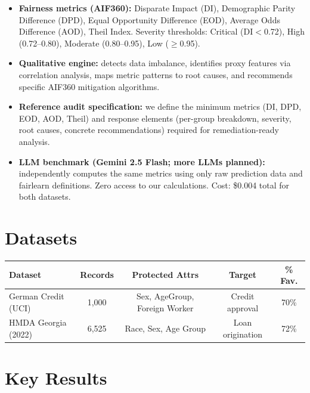 \documentclass[11pt,a4paper]{article}
\begin{document}
\begin{itemize}[nosep, leftmargin=*]
  \item \textbf{Fairness metrics (AIF360):} Disparate Impact (DI), Demographic
        Parity Difference (DPD), Equal Opportunity Difference (EOD), Average
        Odds Difference (AOD), Theil Index. Severity thresholds: Critical
        (DI$<$0.72), High (0.72--0.80), Moderate (0.80--0.95), Low ($\geq$0.95).
  \item \textbf{Qualitative engine:} detects data imbalance, identifies proxy
        features via correlation analysis, maps metric patterns to root causes,
        and recommends specific AIF360 mitigation algorithms.
  \item \textbf{Reference audit specification:} we define the minimum metrics
        (DI, DPD, EOD, AOD, Theil) and response elements (per-group breakdown,
        severity, root causes, concrete recommendations) required for
        remediation-ready analysis.
  \item \textbf{LLM benchmark (Gemini 2.5 Flash; more LLMs planned):}
        independently computes the same metrics using only raw prediction data
        and fairlearn definitions. Zero access to our calculations. Cost:
        \$0.004 total for both datasets.
\end{itemize}

\section*{Datasets}

\begin{center}
\small
\begin{tabular}{lcccc}
\toprule
\textbf{Dataset} & \textbf{Records} & \textbf{Protected Attrs} & \textbf{Target} & \textbf{\% Fav.} \\
\midrule
German Credit (UCI) & 1,000 & Sex, AgeGroup, Foreign Worker & Credit approval & 70\% \\
HMDA Georgia (2022) & 6,525 & Race, Sex, Age Group & Loan origination & 72\% \\
\bottomrule
\end{tabular}
\end{center}

\section*{Key Results}
\end{document}
